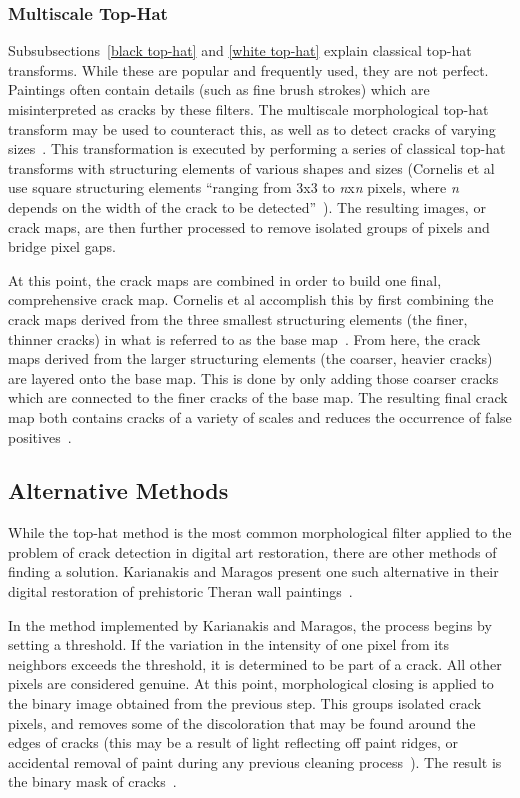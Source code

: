 \documentclass{sig-alternate}
\begin{document}
\subsubsection{Multiscale Top-Hat}\label{multiscale top-hat}
Subsubsections~\ref{black top-hat} and \ref{white top-hat} explain classical top-hat transforms. While these are popular and frequently used, they are not perfect. Paintings often contain details (such as fine brush strokes) which are misinterpreted as cracks by these filters. The multiscale morphological top-hat transform may be used to counteract this, as well as to detect cracks of varying sizes~\cite{Altarpiece:2013}. This transformation is executed by performing a series of classical top-hat transforms with structuring elements of various shapes and sizes (Cornelis et al use square structuring elements ``ranging from 3x3 to \textit{n}x\textit{n} pixels, where \textit{n} depends on the width of the crack to be detected''~\cite{Altarpiece:2013}). The resulting images, or crack maps, are then further processed to remove isolated groups of pixels and bridge pixel gaps.

At this point, the crack maps are combined in order to build one final, comprehensive crack map. Cornelis et al accomplish this by first combining the crack maps derived from the three smallest structuring elements (the finer, thinner cracks) in what is referred to as the base map~\cite{Altarpiece:2013}. From here, the crack maps derived from the larger structuring elements (the coarser, heavier cracks) are layered onto the base map. This is done by only adding those coarser cracks which are connected to the finer cracks of the base map. The resulting final crack map both contains cracks of a variety of scales and reduces the occurrence of false positives~\cite{Altarpiece:2013}.

\subsection{Alternative Methods}\label{alternative}
While the top-hat method is the most common morphological filter applied to the problem of crack detection in digital art restoration, there are other methods of finding a solution. Karianakis and Maragos present one such alternative in their digital restoration of prehistoric Theran wall paintings~\cite{Theran:2013}.

In the method implemented by Karianakis and Maragos, the process begins by setting a threshold. If the variation in the intensity of one pixel from its neighbors exceeds the threshold, it is determined to be part of a crack. All other pixels are considered genuine. At this point, morphological closing is applied to the binary image obtained from the previous step. This groups isolated crack pixels, and removes some of the discoloration that may be found around the edges of cracks (this may be a result of light reflecting off paint ridges, or accidental removal of paint during any previous cleaning process~\cite{Altarpiece:2013}). The result is the binary mask of cracks~\cite{Theran:2013}.
\end{document}
